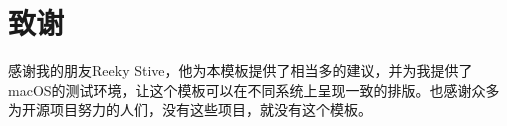\section*{致谢}
感谢我的朋友Reeky Stive，他为本模板提供了相当多的建议，并为我提供了macOS的测试环境，让这个模板可以在不同系统上呈现一致的排版。也感谢众多为开源项目努力的人们，没有这些项目，就没有这个模板。

\newpage